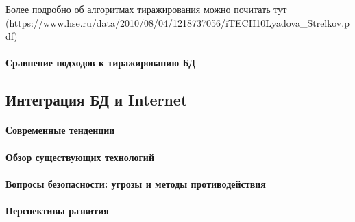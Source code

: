 Более подробно об алгоритмах тиражирования можно почитать тут
(https://www.hse.ru/data/2010/08/04/1218737056/iTECH10\-Lyadova\_Strelkov.pdf)
\paragraph{Сравнение подходов к тиражированию БД}

\subsection{Интеграция БД и Internet}
\paragraph{Современные тенденции}
\paragraph{Обзор существующих технологий}
\paragraph{Вопросы безопасности: угрозы и методы противодействия}
\paragraph{Перспективы развития}